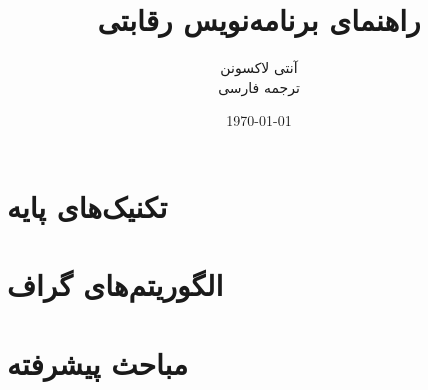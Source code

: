\documentclass[twoside,12pt,a4paper]{book}
\date{\today}
\title{\Huge راهنمای برنامه‌نویس رقابتی}
\author{\Large آنتی لاکسونن \\ \normalsize ترجمه فارسی}
\begin{document}
\frontmatter
\maketitle
\setcounter{tocdepth}{1}
\tableofcontents



\mainmatter
{}
\setcounter{page}{1}

\newcommand{\key}[1] {\textbf{#1}}

\part{تکنیک‌های پایه}










\part{الگوریتم‌های گراف}










\part{مباحث پیشرفته}











\cleardoublepage
{}
{}


\cleardoublepage
\printindex
\end{document}
